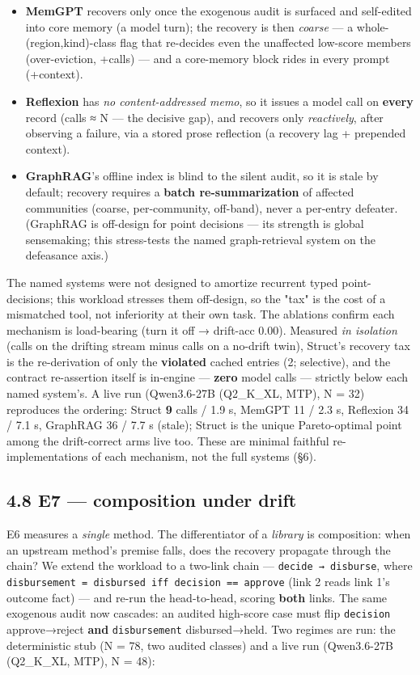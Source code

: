 \documentclass[11pt]{article}
\begin{document}
\begin{itemize}
\item \textbf{MemGPT} recovers only once the exogenous audit is surfaced and self-edited into core memory (a model turn); the recovery is then \emph{coarse} — a whole-(region,kind)-class flag that re-decides even the unaffected low-score members (over-eviction, +calls) — and a core-memory block rides in every prompt (+context).
\item \textbf{Reflexion} has \emph{no content-addressed memo}, so it issues a model call on \textbf{every} record (calls ≈ N — the decisive gap), and recovers only \emph{reactively}, after observing a failure, via a stored prose reflection (a recovery lag + prepended context).
\item \textbf{GraphRAG}'s offline index is blind to the silent audit, so it is stale by default; recovery requires a \textbf{batch re-summarization} of affected communities (coarse, per-community, off-band), never a per-entry defeater. (GraphRAG is off-design for point decisions — its strength is global sensemaking; this stress-tests the named graph-retrieval system on the defeasance axis.)
\end{itemize}

The named systems were not designed to amortize recurrent typed point-decisions; this workload stresses them off-design, so the "tax" is the cost of a mismatched tool, not inferiority at their own task. The ablations confirm each mechanism is load-bearing (turn it off → drift-acc 0.00). Measured \emph{in isolation} (calls on the drifting stream minus calls on a no-drift twin), Struct's recovery tax is the re-derivation of only the \textbf{violated} cached entries (2; selective), and the contract re-assertion itself is in-engine — \textbf{zero} model calls — strictly below each named system's. A live run (Qwen3.6-27B (Q2\_K\_XL, MTP), N = 32) reproduces the ordering: Struct \textbf{9} calls / 1.9 s, MemGPT 11 / 2.3 s, Reflexion 34 / 7.1 s, GraphRAG 36 / 7.7 s (stale); Struct is the unique Pareto-optimal point among the drift-correct arms live too. These are minimal faithful re-implementations of each mechanism, not the full systems (§6).

\subsection*{4.8 E7 — composition under drift}

E6 measures a \emph{single} method. The differentiator of a \emph{library} is composition: when an upstream method's premise falls, does the recovery propagate through the chain? We extend the workload to a two-link chain — \texttt{decide → disburse}, where \texttt{disbursement = disbursed iff decision == approve} (link 2 reads link 1's outcome fact) — and re-run the head-to-head, scoring \textbf{both} links. The same exogenous audit now cascades: an audited high-score case must flip \texttt{decision} approve→reject \textbf{and} \texttt{disbursement} disbursed→held. Two regimes are run: the deterministic stub (N = 78, two audited classes) and a live run (Qwen3.6-27B (Q2\_K\_XL, MTP), N = 48):
\end{document}
